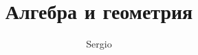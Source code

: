 

\title{Алгебра и геометрия}
\author{Sergio}


    \maketitle
    \newpage
    \tableofcontents
    \newpage
    


